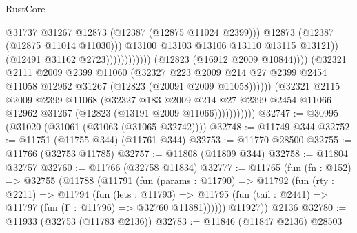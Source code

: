 \begin{lexlean}{RustCore}
\begin{coremodule}
                                                        @31737
                                                        @31267
                                                        @12873
                                                        (@12387 (@12875 @11024 @2399)))
                                                      @12873
                                                      (@12387 (@12875 @11014 @11030)))
                                                    @13100
                                                    @13103
                                                    @13106
                                                    @13110
                                                    @13115
                                                    @13121))
                                                (@12491 @31162 @2723))))))))))))
                          (@12823 (@16912 @2009 @10844))))
                      (@32321
                        @2111
                        @2009
                        @2399
                        @11060
                        (@32327
                          @223
                          @2009
                          @214
                          @27
                          @2399
                          @2454
                          @11058
                          @12962
                          @31267
                          (@12823 (@20091 @2009 @11058))))))
                  (@32321
                    @2115
                    @2009
                    @2399
                    @11068
                    (@32327
                      @183
                      @2009
                      @214
                      @27
                      @2399
                      @2454
                      @11066
                      @12962
                      @31267
                      (@12823 (@13191 @2009 @11066)))))))))))
@32747 := @30995 (@31020 (@31061 (@31063 (@31065 @32742))))
@32748 := @11749 @344
@32752 := @11751 (@11755 @344) (@11761 @344)
@32753 := @11770 @28500
@32755 := @11766 (@32753 @11785)
@32757 := @11808 (@11809 @344)
@32758 := @11804 @32757
@32760 := @11766 (@32758 @11834)
@32777 := @11765
    (fun (fn : @152) =>
    @32755
      (@11788
        (@11791
          (fun (params : @11790) =>
          @11792
            (fun (rty : @2211) =>
            @11794
              (fun (lets : @11793) =>
              @11795 (fun (tail : @2441) => @11797 (fun (Γ : @11796) => @32760 @11881))))))
        @11927))
    @2136
@32780 := @11933 (@32753 (@11783 @2136))
@32783 := @11846 (@11847 @2136) @28503

\end{coremodule}
\end{lexlean}
